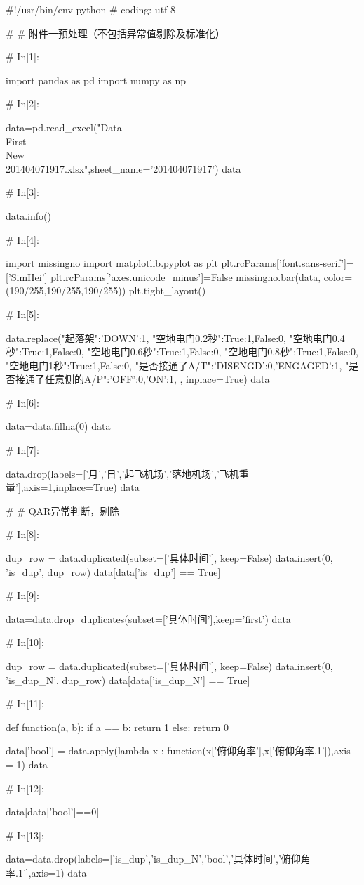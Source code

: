 \documentclass{MathorCupModeling}
\begin{document}
\begin{python}
#!/usr/bin/env python
# coding: utf-8

# # 附件一预处理（不包括异常值剔除及标准化）

# In[1]:


import pandas as pd
import numpy as np


# In[2]:


data=pd.read_excel("Data\\First\\New\\201404071917.xlsx",sheet_name='201404071917')
data


# In[3]:


data.info()


# In[4]:


import missingno
import matplotlib.pyplot as plt
plt.rcParams['font.sans-serif']=['SimHei']
plt.rcParams['axes.unicode_minus']=False
missingno.bar(data, color=(190/255,190/255,190/255))
plt.tight_layout()


# In[5]:


data.replace({"起落架":{'DOWN':1},
              "空地电门0.2秒":{True:1,False:0},
              "空地电门0.4秒":{True:1,False:0},
              "空地电门0.6秒":{True:1,False:0},
              "空地电门0.8秒":{True:1,False:0},
              "空地电门1秒":{True:1,False:0},
              "是否接通了A/T":{'DISENGD':0,'ENGAGED':1},
              "是否接通了任意侧的A/P":{'OFF':0,'ON':1},
              }, inplace=True)
data


# In[6]:


data=data.fillna(0)
data


# In[7]:


data.drop(labels=['月','日','起飞机场','落地机场','飞机重量'],axis=1,inplace=True)
data


# # QAR异常判断，剔除

# In[8]:


dup_row = data.duplicated(subset=['具体时间'], keep=False)
data.insert(0, 'is_dup', dup_row)
data[data['is_dup'] == True]


# In[9]:


data=data.drop_duplicates(subset=['具体时间'],keep='first')
data


# In[10]:


dup_row = data.duplicated(subset=['具体时间'], keep=False)
data.insert(0, 'is_dup_N', dup_row)
data[data['is_dup_N'] == True]


# In[11]:


def function(a, b):
    if a == b:
        return 1
    else:
        return 0


data['bool'] = data.apply(lambda x : function(x['俯仰角率'],x['俯仰角率.1']),axis = 1)
data


# In[12]:


data[data['bool']==0]


# In[13]:


data=data.drop(labels=['is_dup','is_dup_N','bool','具体时间','俯仰角率.1'],axis=1)
data


\end{python}
\end{document}
